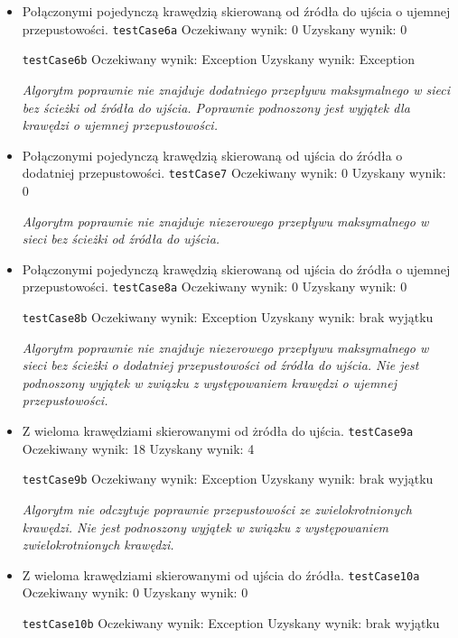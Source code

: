 \begin{itemize}[nosep]
    \item Połączonymi pojedynczą krawędzią skierowaną od źródła do ujścia o ujemnej przepustowości.
    \texttt{testCase6a}
    Oczekiwany wynik: 0
    Uzyskany wynik: 0

    \texttt{testCase6b}
    Oczekiwany wynik: Exception
    Uzyskany wynik: Exception

    \emph{Algorytm poprawnie nie znajduje
    dodatniego przepływu maksymalnego w sieci bez ścieżki od źródła do ujścia. Poprawnie
    podnoszony jest wyjątek dla krawędzi o ujemnej przepustowości.}

    \item Połączonymi pojedynczą krawędzią skierowaną od ujścia do źródła o dodatniej przepustowości.
    \texttt{testCase7}
    Oczekiwany wynik: 0
    Uzyskany wynik: 0

    \emph{Algorytm poprawnie nie znajduje niezerowego
    przepływu maksymalnego w sieci bez ścieżki od źródła do ujścia.}

    \item Połączonymi pojedynczą krawędzią skierowaną od ujścia do źródła o ujemnej przepustowości.
    \texttt{testCase8a}
    Oczekiwany wynik: 0
    Uzyskany wynik: 0

    \texttt{testCase8b}
    Oczekiwany wynik: Exception
    Uzyskany wynik: brak wyjątku

    \emph{Algorytm poprawnie nie znajduje
    niezerowego przepływu maksymalnego w sieci bez ścieżki o dodatniej
    przepustowości od źródła do ujścia. Nie jest podnoszony wyjątek
    w związku z występowaniem krawędzi o ujemnej przepustowości.}

    \item Z wieloma krawędziami skierowanymi od żródła do ujścia.
    \texttt{testCase9a}
    Oczekiwany wynik: 18
    Uzyskany wynik: 4

    \texttt{testCase9b}
    Oczekiwany wynik: Exception
    Uzyskany wynik: brak wyjątku

    \emph{Algorytm nie odczytuje
    poprawnie przepustowości ze zwielokrotnionych krawędzi. Nie jest
    podnoszony wyjątek w związku z występowaniem zwielokrotnionych krawędzi.}

    \item Z wieloma krawędziami skierowanymi od ujścia do źródła.
    \texttt{testCase10a}
    Oczekiwany wynik: 0
    Uzyskany wynik: 0

    \texttt{testCase10b}
    Oczekiwany wynik: Exception
    Uzyskany wynik: brak wyjątku


\end{itemize}
